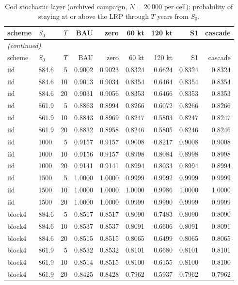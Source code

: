 \documentclass[11pt,a4paper]{article}
\begin{document}
\begin{longtable}{llrrrrrrr}
\caption{Cod stochastic layer (archived campaign, $N=20\,000$ per cell): probability of staying at or above the LRP through $T$ years from $S_0$.}\label{tab:si-stoch}\\
\toprule
scheme & $S_0$ & $T$ & BAU & zero & 60 kt & 120 kt & S1 & cascade \\
\midrule
\endfirsthead
\multicolumn{9}{l}{\emph{(continued)}}\\
\toprule
scheme & $S_0$ & $T$ & BAU & zero & 60 kt & 120 kt & S1 & cascade \\
\midrule
\endhead
\bottomrule
\endfoot
iid & 884.6 & 5 & 0.9002 & 0.9023 & 0.8324 & 0.6624 & 0.8324 & 0.8324 \\
iid & 884.6 & 10 & 0.9013 & 0.9034 & 0.8354 & 0.6464 & 0.8354 & 0.8354 \\
iid & 884.6 & 20 & 0.9031 & 0.9056 & 0.8353 & 0.6466 & 0.8353 & 0.8353 \\
iid & 861.9 & 5 & 0.8863 & 0.8994 & 0.8266 & 0.6072 & 0.8266 & 0.8266 \\
iid & 861.9 & 10 & 0.8843 & 0.8969 & 0.8247 & 0.5803 & 0.8247 & 0.8247 \\
iid & 861.9 & 20 & 0.8832 & 0.8958 & 0.8246 & 0.5805 & 0.8246 & 0.8246 \\
iid & 1000 & 5 & 0.9157 & 0.9157 & 0.9008 & 0.8217 & 0.9008 & 0.9008 \\
iid & 1000 & 10 & 0.9156 & 0.9157 & 0.8998 & 0.8084 & 0.8998 & 0.8998 \\
iid & 1000 & 20 & 0.9141 & 0.9141 & 0.8994 & 0.8033 & 0.8994 & 0.8994 \\
iid & 1500 & 5 & 1.0000 & 1.0000 & 0.9999 & 0.9992 & 0.9999 & 0.9999 \\
iid & 1500 & 10 & 1.0000 & 1.0000 & 1.0000 & 0.9986 & 1.0000 & 1.0000 \\
iid & 1500 & 20 & 1.0000 & 1.0000 & 0.9999 & 0.9990 & 0.9999 & 0.9999 \\
block4 & 884.6 & 5 & 0.8517 & 0.8517 & 0.8090 & 0.7483 & 0.8090 & 0.8090 \\
block4 & 884.6 & 10 & 0.8537 & 0.8537 & 0.8091 & 0.6606 & 0.8091 & 0.8091 \\
block4 & 884.6 & 20 & 0.8515 & 0.8515 & 0.8065 & 0.6499 & 0.8065 & 0.8065 \\
block4 & 861.9 & 5 & 0.8532 & 0.8532 & 0.8101 & 0.6680 & 0.8101 & 0.8101 \\
block4 & 861.9 & 10 & 0.8514 & 0.8515 & 0.8100 & 0.6155 & 0.8100 & 0.8100 \\
block4 & 861.9 & 20 & 0.8425 & 0.8428 & 0.7962 & 0.5937 & 0.7962 & 0.7962 \\

\end{longtable}
\end{document}

